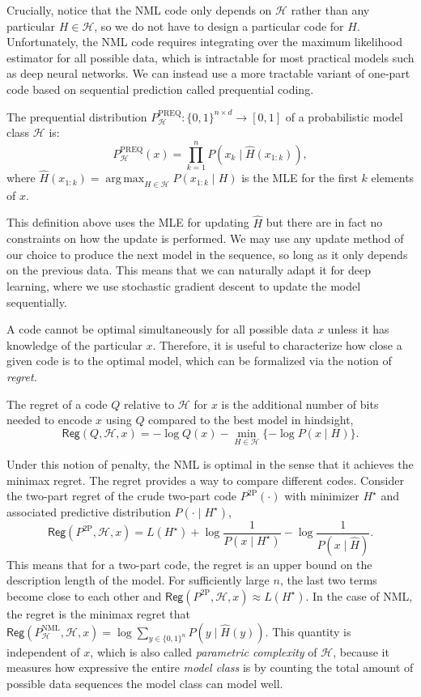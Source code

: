 \documentclass[twoside]{article}
\DeclareMathOperator*{\argmax}{arg\,max}
\begin{document}
Crucially, notice that the NML code only depends on $\mathcal{H}$ rather than any particular $H \in \mathcal{H}$, so we do not have to design a particular code for $H$.
Unfortunately, the NML code requires integrating over the maximum likelihood estimator for all possible data, which is intractable for most practical models such as deep neural networks.
We can instead use a more tractable variant of one-part code based on sequential prediction called prequential coding.
\begin{definition}
    The prequential distribution $P^{\mathrm{PREQ}}_{\mathcal{H}}: \{0,1\}^{n\times d} \rightarrow [0, 1]$ of a probabilistic model class $\mathcal{H}$ is:
    $$P^{\mathrm{PREQ}}_{\mathcal{H}}(x) = \prod_{k=1}^n P(x_k \mid \widehat{H}(x_{1:k})),$$
    where $\widehat{H}(x_{1:k}) = \argmax_{H \in \mathcal{H}} P(x_{1:k} \mid H)$ is the MLE for the first $k$ elements of $x$. 
\end{definition}
This definition above uses the MLE for updating $\widehat{H}$ but there are in fact no constraints on how the update is performed.
We may use any update method of our choice to produce the next model in the sequence, so long as it only depends on the previous data.
This means that we can naturally adapt it for deep learning, where we use stochastic gradient descent to update the model sequentially.

A code cannot be optimal simultaneously for all possible data $x$ unless it has knowledge of the particular $x$. Therefore, it is useful to characterize how close a given code is to the optimal model, which can be formalized via the notion of \emph{regret}.
\begin{definition}
    The regret of a code $Q$ relative to $\mathcal{H}$ for $x$ is the additional number of bits needed to encode $x$ using $Q$ compared to the best model in hindsight,
    $$\mathsf{Reg}(Q, \mathcal{H}, x) = -\log Q(x) - \min_{H \in \mathcal{H}} \{-\log P(x \mid H)\}.$$
\end{definition}
Under this notion of penalty, the NML is optimal in the sense that it achieves the minimax regret.
The regret provides a way to compare different codes.
Consider the two-part regret of the crude two-part code $P^{\mathrm{2P}}(\cdot)$ with minimizer $H^\star$ and associated predictive distribution $P(\cdot \mid H^\star)$, $$\mathsf{Reg}(P^{\mathrm{2P}}, \mathcal{H}, x) = L(H^\star) + \log \frac{1}{P(x \mid H^\star)} - \log \frac{1}{P(x \mid \widehat{H})}.$$
This means that for a two-part code, the regret is an upper bound on the description length of the model.
For sufficiently large $n$, the last two terms become close to each other and $\mathsf{Reg}(P^{\mathrm{2P}}, \mathcal{H}, x) \approx L(H^\star)$.
In the case of NML, the regret is the minimax regret that $\mathsf{Reg}(P^{\mathrm{NML}}_{\mathcal{H}}, \mathcal{H}, x) = \log \sum_{y\in \{0,1\}^n} P(y \mid \widehat{H}(y))$. 
This quantity is independent of $x$, which is also called \emph{parametric complexity} of $\mathcal{H}$, because it measures how expressive the entire \emph{model class} is by counting the total amount of possible data sequences the model class can model well.
\end{document}
